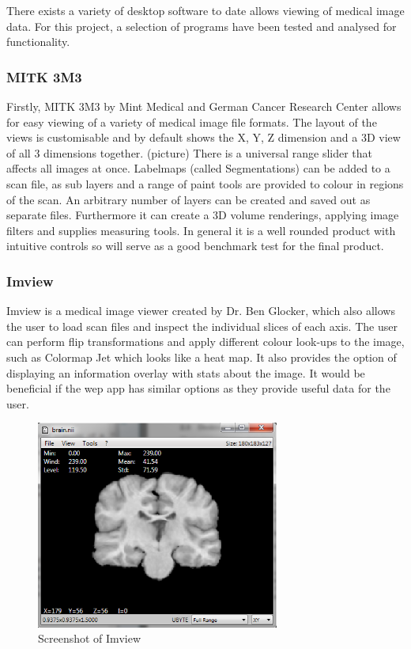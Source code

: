\documentclass[a4paper,11pt,titlepage]{article}
\begin{document}
There exists a variety of desktop software to date allows viewing of medical image data. For this project, a selection of programs have been tested and analysed for functionality.

\subsubsection{MITK 3M3}
     Firstly, MITK 3M3 by Mint Medical and German Cancer Research Center allows for easy viewing of a variety of medical image file formats. The layout of the views is customisable and by default shows the X, Y, Z dimension and a 3D view of all 3 dimensions together. (picture) There is a universal range slider that affects all images at once. Labelmaps (called Segmentations) can be added to a scan file, as sub layers and a range of paint tools are provided to colour in regions of the scan. An arbitrary number of layers can be created and saved out as separate files. 
     Furthermore it can create a 3D volume renderings, applying image filters and supplies measuring tools. In general it is a well rounded product with intuitive controls so will serve as a good benchmark test for the final product.

\subsubsection{Imview}
Imview is a medical image viewer created by Dr. Ben Glocker, which also allows the user to load scan files and inspect the individual slices of each axis. The user can perform flip transformations and apply different colour look-ups to the image, such as Colormap Jet which looks like a heat map. It also provides the option of displaying an information overlay with stats about the image. It would be beneficial if the wep app has similar options as they provide useful data for the user.

\begin{figure}[ht!]
\centering
\includegraphics[width=80mm]{graphics/imview_01.png}
\caption{Screenshot of Imview}
\label{fig:UIdesign1}
\end{figure}
\end{document}
